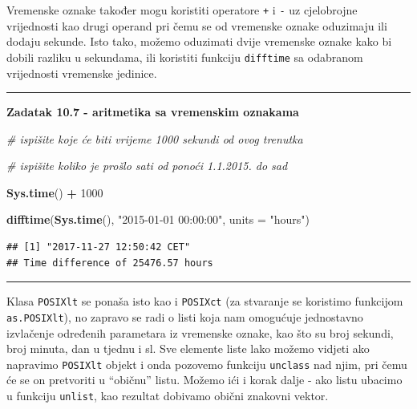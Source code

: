 \documentclass[]{book}
\newenvironment{Shaded}{\begin{snugshade}}{\end{snugshade}}
\newcommand{\KeywordTok}[1]{\textcolor[rgb]{0.13,0.29,0.53}{\textbf{#1}}}
\newcommand{\DataTypeTok}[1]{\textcolor[rgb]{0.13,0.29,0.53}{#1}}
\newcommand{\DecValTok}[1]{\textcolor[rgb]{0.00,0.00,0.81}{#1}}
\newcommand{\StringTok}[1]{\textcolor[rgb]{0.31,0.60,0.02}{#1}}
\newcommand{\CommentTok}[1]{\textcolor[rgb]{0.56,0.35,0.01}{\textit{#1}}}
\newcommand{\OperatorTok}[1]{\textcolor[rgb]{0.81,0.36,0.00}{\textbf{#1}}}
\newcommand{\NormalTok}[1]{#1}
\theoremstyle{definition}
\theoremstyle{definition}
\theoremstyle{definition}
\theoremstyle{remark}
\begin{document}
Vremenske oznake također mogu koristiti operatore \texttt{+} i
\texttt{-} uz cjelobrojne vrijednosti kao drugi operand pri čemu se od
vremenske oznake oduzimaju ili dodaju sekunde. Isto tako, možemo
oduzimati dvije vremenske oznake kako bi dobili razliku u sekundama, ili
koristiti funkciju \texttt{difftime} sa odabranom vrijednosti vremenske
jedinice.

\begin{center}\rule{0.5\linewidth}{\linethickness}\end{center}

\textbf{Zadatak 10.7 - aritmetika sa vremenskim oznakama}

\begin{Shaded}
\begin{Highlighting}[]
\CommentTok{# ispišite koje će biti vrijeme 1000 sekundi od ovog trenutka}

\CommentTok{# ispišite koliko je prošlo sati od ponoći 1.1.2015. do sad}
\end{Highlighting}
\end{Shaded}

\begin{Shaded}
\begin{Highlighting}[]
\KeywordTok{Sys.time}\NormalTok{() }\OperatorTok{+}\StringTok{ }\DecValTok{1000}

\KeywordTok{difftime}\NormalTok{(}\KeywordTok{Sys.time}\NormalTok{(), }\StringTok{"2015-01-01 00:00:00"}\NormalTok{, }\DataTypeTok{units =} \StringTok{"hours"}\NormalTok{)}
\end{Highlighting}
\end{Shaded}

\begin{verbatim}
## [1] "2017-11-27 12:50:42 CET"
## Time difference of 25476.57 hours
\end{verbatim}

\begin{center}\rule{0.5\linewidth}{\linethickness}\end{center}

Klasa \texttt{POSIXlt} se ponaša isto kao i \texttt{POSIXct} (za
stvaranje se koristimo funkcijom \texttt{as.POSIXlt}), no zapravo se
radi o listi koja nam omogućuje jednostavno izvlačenje određenih
parametara iz vremenske oznake, kao što su broj sekundi, broj minuta,
dan u tjednu i sl. Sve elemente liste lako možemo vidjeti ako napravimo
\texttt{POSIXlt} objekt i onda pozovemo funkciju \texttt{unclass} nad
njim, pri čemu će se on pretvoriti u ``običnu'' listu. Možemo ići i
korak dalje - ako listu ubacimo u funkciju \texttt{unlist}, kao rezultat
dobivamo obični znakovni vektor.
\end{document}
